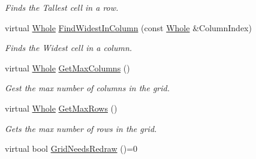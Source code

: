 \begin{DoxyCompactItemize}
\begin{DoxyCompactList}\small\item\em Finds the Tallest cell in a row. \item\end{DoxyCompactList}\item 
\hypertarget{classphys_1_1UI_1_1CellGrid_af659299b53bb143d6593c6ac84ef45a3}{
virtual \hyperlink{namespacephys_a460f6bc24c8dd347b05e0366ae34f34a}{Whole} \hyperlink{classphys_1_1UI_1_1CellGrid_af659299b53bb143d6593c6ac84ef45a3}{FindWidestInColumn} (const \hyperlink{namespacephys_a460f6bc24c8dd347b05e0366ae34f34a}{Whole} \&ColumnIndex)}
\label{classphys_1_1UI_1_1CellGrid_af659299b53bb143d6593c6ac84ef45a3}

\begin{DoxyCompactList}\small\item\em Finds the Widest cell in a column. \item\end{DoxyCompactList}\item 
\hypertarget{classphys_1_1UI_1_1CellGrid_ac7338fc2ba7cc9575c9f47d70d998574}{
virtual \hyperlink{namespacephys_a460f6bc24c8dd347b05e0366ae34f34a}{Whole} \hyperlink{classphys_1_1UI_1_1CellGrid_ac7338fc2ba7cc9575c9f47d70d998574}{GetMaxColumns} ()}
\label{classphys_1_1UI_1_1CellGrid_ac7338fc2ba7cc9575c9f47d70d998574}

\begin{DoxyCompactList}\small\item\em Gest the max number of columns in the grid. \item\end{DoxyCompactList}\item 
\hypertarget{classphys_1_1UI_1_1CellGrid_ab031e5d26dcb8b2617533e284816b5ed}{
virtual \hyperlink{namespacephys_a460f6bc24c8dd347b05e0366ae34f34a}{Whole} \hyperlink{classphys_1_1UI_1_1CellGrid_ab031e5d26dcb8b2617533e284816b5ed}{GetMaxRows} ()}
\label{classphys_1_1UI_1_1CellGrid_ab031e5d26dcb8b2617533e284816b5ed}

\begin{DoxyCompactList}\small\item\em Gets the max number of rows in the grid. \item\end{DoxyCompactList}\item 
\hypertarget{classphys_1_1UI_1_1CellGrid_aa4c2f8c2c5f11ce5cffa1b8a1c44d57d}{
virtual bool \hyperlink{classphys_1_1UI_1_1CellGrid_aa4c2f8c2c5f11ce5cffa1b8a1c44d57d}{GridNeedsRedraw} ()=0}
\label{classphys_1_1UI_1_1CellGrid_aa4c2f8c2c5f11ce5cffa1b8a1c44d57d}


\end{DoxyCompactItemize}
